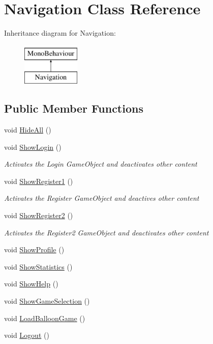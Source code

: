 \hypertarget{classNavigation}{}\section{Navigation Class Reference}
\label{classNavigation}
Inheritance diagram for Navigation\+:\begin{figure}[H]
\begin{center}
\leavevmode
\includegraphics[height=2.000000cm]{classNavigation}
\end{center}
\end{figure}
\subsection*{Public Member Functions}
\begin{DoxyCompactItemize}
\item 
void \hyperlink{classNavigation_a4470d35dbb7dc8062db61961e4b9b66a}{Hide\+All} ()
\item 
void \hyperlink{classNavigation_a288d2b756704cdde0879b922835f7489}{Show\+Login} ()
\begin{DoxyCompactList}\small\item\em Activates the Login Game\+Object and deactivates other content \end{DoxyCompactList}\item 
void \hyperlink{classNavigation_ab7c8d6dd421eeac7ebbafd373f478583}{Show\+Register1} ()
\begin{DoxyCompactList}\small\item\em Activates the Register Game\+Object and deactives other content \end{DoxyCompactList}\item 
void \hyperlink{classNavigation_a49064344a70692035504796c4acb4e55}{Show\+Register2} ()
\begin{DoxyCompactList}\small\item\em Activates the Register2 Game\+Object and deactivates other content \end{DoxyCompactList}\item 
void \hyperlink{classNavigation_ad8994936c6b8f470c56fa497b284ddf5}{Show\+Profile} ()
\item 
void \hyperlink{classNavigation_ad0b71ff144ebad450751c0493a7b4fba}{Show\+Statistics} ()
\item 
void \hyperlink{classNavigation_a9464e847ef1163e7e6310d8c5269a39e}{Show\+Help} ()
\item 
void \hyperlink{classNavigation_a4a0ece5dd7cc7d0b22ec95abd9184d18}{Show\+Game\+Selection} ()
\item 
void \hyperlink{classNavigation_a286cbe5eb67d239c2474e3af29b2fdc7}{Load\+Balloon\+Game} ()
\item 
void \hyperlink{classNavigation_ae8fc186f1a3837a225d0dbff1cd103b1}{Logout} ()
\end{DoxyCompactItemize}

